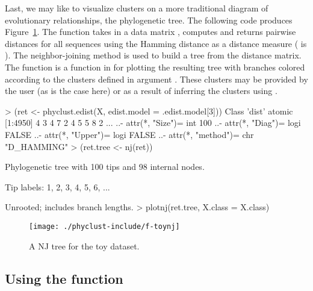 Last, we may like to visualize clusters on a more traditional diagram of evolutionary relationships, the phylogenetic tree.
The following code produces Figure~\ref{fig:toynj}.
The  function takes in a data
matrix , computes and returns pairwise distances for all sequences
using the Hamming distance
as a distance measure ( is ).
The neighbor-joining method \citep{Saitou1987} is used to build a tree from
the distance matrix. The function  is a function in  for plotting
the resulting tree with branches colored according to the clusters defined in argument .
These clusters may be provided by the user (as is the case here) or as a result of inferring the clusters using .
\begin{Code}
> (ret <- phyclust.edist(X, edist.model = .edist.model[3]))
Class 'dist'  atomic [1:4950] 4 3 4 7 2 4 5 5 8 2 ...
  ..- attr(*, "Size")= int 100
  ..- attr(*, "Diag")= logi FALSE
  ..- attr(*, "Upper")= logi FALSE
  ..- attr(*, "method")= chr "D_HAMMING"
> (ret.tree <- nj(ret))

Phylogenetic tree with 100 tips and 98 internal nodes.

Tip labels:
        1, 2, 3, 4, 5, 6, ...

Unrooted; includes branch lengths.
> plotnj(ret.tree, X.class = X.class)
\end{Code}
\begin{figure}[h]
\begin{center}
\texttt{[image: ./phyclust-include/f-toynj]}
\caption{A NJ tree for the toy dataset.}
\label{fig:toynj}
\end{center}
\end{figure}




\subsection[Using the phyclust() function]{Using the  function}
\label{sec:phyclust}

